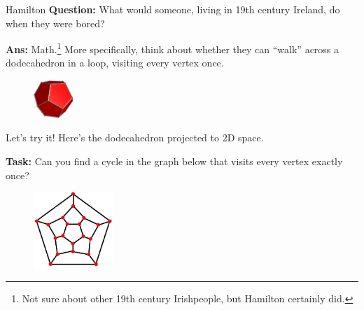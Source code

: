 \documentclass{beamer}
\begin{document}
\begin{frame}{Hamilton}
\textbf{Question:} What would someone, living in 19th century Ireland, do when they were bored?

\pause

\textbf{Ans:} Math.\footnote{Not sure about other 19th century Irishpeople, but Hamilton certainly did.}  \pause More specifically, think about whether they can ``walk'' across a dodecahedron in a loop, visiting every vertex once.

\begin{figure}[h]
    \centering
    \includegraphics[width=1.5cm]{img/Dodecahedron.png}
\end{figure}

\pause
 
Let's try it! Here's the dodecahedron projected to 2D space. \pause

\textbf{Task:} Can you find a cycle in the graph below that visits every vertex exactly once?

\begin{figure}[h]
    \centering
    \includegraphics[width=3cm]{img/projected_dodecahedron.png}
\end{figure}

\end{frame}
\end{document}
